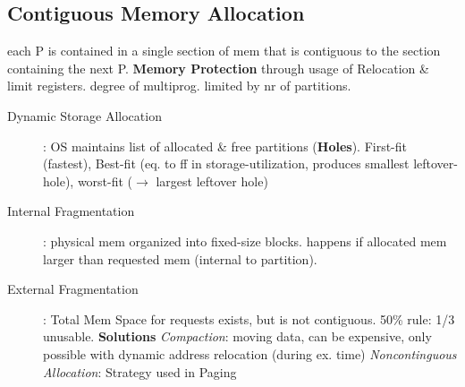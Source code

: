 \subsection*{Contiguous Memory Allocation}
each P is contained in a single section of mem that is contiguous to the section containing the next P. \textbf{Memory Protection} through usage of Relocation \& limit registers. degree of multiprog. limited by nr of partitions.
\begin{description}
    \item[Dynamic Storage Allocation]: OS maintains list of allocated \& free partitions (\textbf{Holes}). First-fit (fastest), Best-fit (eq. to ff in storage-utilization, produces smallest leftover-hole), worst-fit ($\rightarrow$ largest leftover hole) \\
    \item[Internal Fragmentation]: physical mem organized into fixed-size blocks. happens if allocated mem larger than requested mem (internal to partition). \\
    \item[External Fragmentation]: Total Mem Space for requests exists, but is not contiguous. 50\% rule: 1/3 unusable. \textbf{Solutions} \textit{Compaction}: moving data, can be expensive, only possible with dynamic address relocation (during ex. time) \textit{Noncontinguous Allocation}: Strategy used in Paging \\
\end{description}

